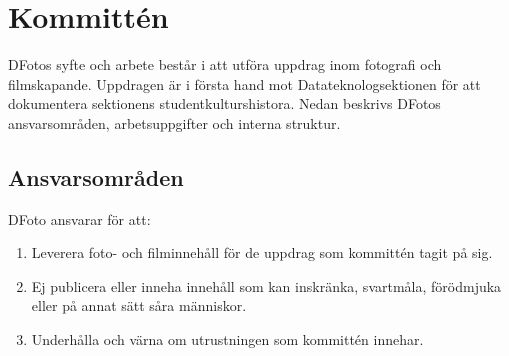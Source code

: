 \section{Kommittén}
DFotos syfte och arbete består i att utföra uppdrag inom fotografi och filmskapande. Uppdragen är i första hand mot Datateknologsektionen för att dokumentera sektionens studentkulturshistora. 
Nedan beskrivs DFotos ansvarsområden, arbetsuppgifter och interna struktur. 

\subsection{Ansvarsområden}
DFoto ansvarar för att:
\begin{enumerate}
    \item Leverera foto- och filminnehåll för de uppdrag som kommittén tagit på sig.
    \item Ej publicera eller inneha innehåll som kan inskränka, svartmåla, förödmjuka eller på annat sätt såra människor.
    \item Underhålla och värna om utrustningen som kommittén innehar. 
\end{enumerate}



